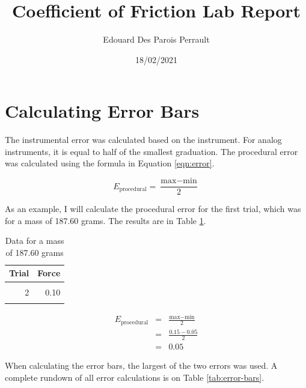 \documentclass{chemlab}
\title{Coefficient of Friction Lab Report}
\author{Edouard Des Parois Perrault}
\date{18/02/2021}
\begin{document}
    \maketitle
        \tableofcontents
        \hypertarget{calculating-error-bars}{%
\section{\texorpdfstring{Calculating Error Bars
\label{sec:err}}{Calculating Error Bars }}\label{calculating-error-bars}}

The instrumental error was calculated based on the instrument. For
analog instruments, it is equal to half of the smallest graduation. The
procedural error was calculated using the formula in Equation
\eqref{eqn:error}.

\begin{equation}
  E_{\text{procedural}} = \frac{\text{max} - \text{min}}{2} \label{eqn:error}
\end{equation}

As an example, I will calculate the procedural error for the first
trial, which was for a mass of 187.60 grams. The results are in Table
\ref{tab:trials}.

\begin{table}[H]

\caption{\label{tab:trials}Data for a mass of 187.60 grams}
\centering
\begin{tabular}[t]{rr}
\toprule
Trial & Force\\
\midrule
\cellcolor{gray!6}{1} & \cellcolor{gray!6}{0.15}\\
2 & 0.10\\
\cellcolor{gray!6}{3} & \cellcolor{gray!6}{0.05}\\
\bottomrule
\end{tabular}
\end{table}

\begin{eqnarray}
  E_{\text{procedural}} & = & \frac{\text{max} - \text{min}}{2} \\
                        & = & \frac{0.15-0.05}{2} \\
                        & = & 0.05 
\end{eqnarray}

When calculating the error bars, the largest of the two errors was used.
A complete rundown of all error calculations is on Table
\ref{tab:error-bars}.
\end{document}
